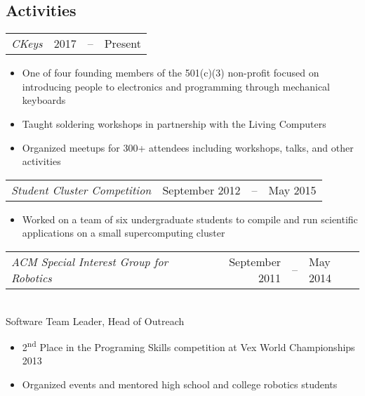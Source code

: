 \documentclass[line,margin]{res}
\begin{document}
\begin{resume}
  \section{\textcolor{TealBlue}{Activities}}
    \begin{tabular}{@{} p{} r c l @{}}
	    {\sl CKeys\/} & 2017 & -- & Present %
    \end{tabular}
      \begin{itemize}
	\setlength{\itemsep}{-2pt}
        \item One of four founding members of the 501(c)(3) non-profit focused on introducing people to electronics and programming through mechanical keyboards %
        \item Taught soldering workshops in partnership with the Living Computers
        \item Organized meetups for 300+ attendees including workshops, talks, and other activities
      \end{itemize}

    \begin{tabular}{@{} p{} r c l @{}}
	    {\sl Student Cluster Competition\/} & September 2012 & -- & May 2015 %
    \end{tabular}
      \begin{itemize}
	\setlength{\itemsep}{-2pt}
        \item Worked on a team of six undergraduate students to compile and run scientific applications on a small supercomputing cluster
      \end{itemize}
  
    \begin{tabular}{@{} p{} r c l @{}}
	    {\sl ACM Special Interest Group for Robotics\/} & September 2011 & -- & May 2014 \\%
    \end{tabular} \\
      Software Team Leader, Head of Outreach
      \begin{itemize}
	\setlength{\itemsep}{-2pt}
        \item 2\textsuperscript{nd} Place in the Programing Skills competition at Vex World Championships 2013
        \item Organized events and mentored high school and college robotics students
      \end{itemize}
    

\end{resume}
\end{document}
